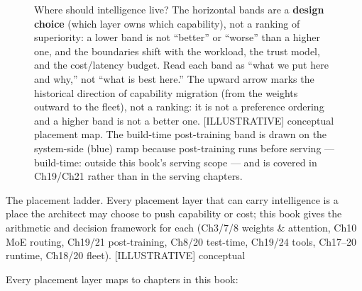 \begin{figure}
\centering
{}
\caption[Where should intelligence live? The horizontal bands are a \textbf{design choice}]{Where should intelligence live? The horizontal bands are a \textbf{design choice} (which layer owns which capability), not a ranking of superiority: a lower band is not ``better'' or ``worse'' than a higher one, and the boundaries shift with the workload, the trust model, and the cost/latency budget. Read each band as ``what we put here and why,'' not ``what is best here.'' The upward arrow marks the historical direction of capability migration (from the weights outward to the fleet), not a ranking: it is not a preference ordering and a higher band is not a better one. \mbox{{[}ILLUSTRATIVE{]}} conceptual placement map. The build-time post-training band is drawn on the system-side (blue) ramp because post-training runs before serving --- build-time: outside this book's serving scope --- and is covered in Ch19/Ch21 rather than in the serving chapters.}
\end{figure}

The placement ladder. Every placement layer that can carry intelligence
is a place the architect may choose to push capability or cost; this
book gives the arithmetic and decision framework for each (Ch3/7/8
weights \& attention, Ch10 MoE routing, Ch19/21 post-training, Ch8/20
test-time, Ch19/24 tools, Ch17--20 runtime, Ch18/20 fleet).
\mbox{{[}ILLUSTRATIVE{]}} conceptual

Every placement layer maps to chapters in this book:


